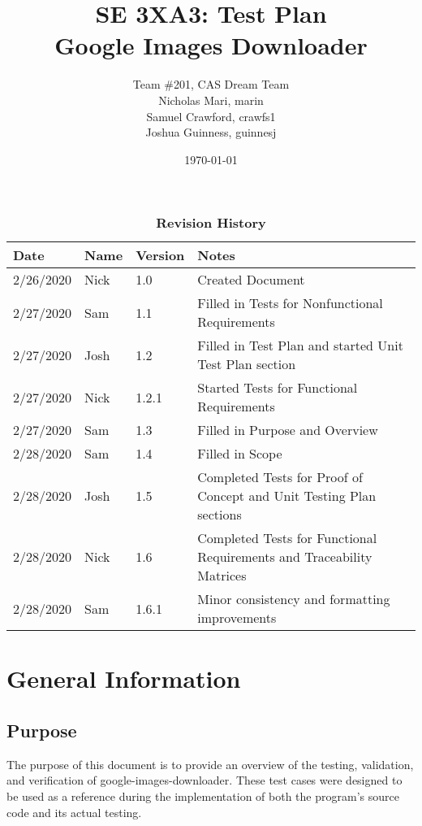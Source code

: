 \documentclass[12pt, titlepage]{article}
\title{SE 3XA3: Test Plan\\Google Images Downloader}
\author{Team \#201, CAS Dream Team
		\\ Nicholas Mari, marin
		\\ Samuel Crawford, crawfs1
		\\ Joshua Guinness, guinnesj
}
\date{\today}
\begin{document}
\maketitle

\tableofcontents
\listoftables

\begin{table}[!b]
\begin{tabularx}{\textwidth}{lllp{7.5cm}}
\toprule {\bf Date} & {\bf Name} & {\bf Version} & {\bf Notes}\\
\midrule
2/26/2020 & Nick & 1.0 & Created Document\\
2/27/2020 & Sam & 1.1 & Filled in Tests for Nonfunctional Requirements\\
2/27/2020 & Josh & 1.2 & Filled in Test Plan and started Unit Test Plan section\\
2/27/2020 & Nick & 1.2.1 & Started Tests for Functional Requirements\\
2/27/2020 & Sam & 1.3 & Filled in Purpose and Overview\\
2/28/2020 & Sam & 1.4 & Filled in Scope\\
2/28/2020 & Josh & 1.5 & Completed Tests for Proof of Concept and Unit Testing Plan sections\\
2/28/2020 & Nick & 1.6 & Completed Tests for Functional Requirements and Traceability Matrices\\
2/28/2020 & Sam & 1.6.1 & Minor consistency and formatting improvements\\
\bottomrule
\end{tabularx}
\caption{\bf Revision History}
\end{table}

\newpage


\section{General Information}

\subsection{Purpose}
The purpose of this document is to provide an overview of the testing, validation, and verification of google-images-downloader. These test cases were designed to be used as a reference during the implementation of both the program's source code and its actual testing.
\end{document}
